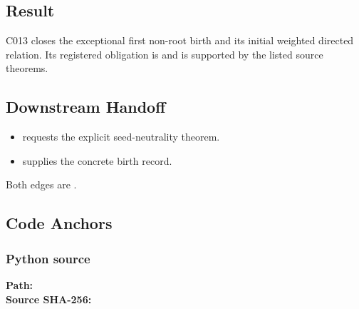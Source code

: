 \subsection{Result}\label{result-10}

C013 closes the exceptional first non-root birth and its initial
weighted directed relation. Its registered obligation is
\texttt{\protect{}} and is supported by the listed source
theorems.

\subsection{Downstream Handoff}\label{downstream-handoff-10}

\begin{itemize}
\tightlist
\item
  \texttt{\protect{}} requests the explicit
  seed-neutrality theorem.
\item
  \texttt{\protect{}} supplies the concrete
  birth record.
\end{itemize}

Both edges are \texttt{\protect{}}.

\subsection{Code Anchors}\label{code-anchors-8}

\subsubsection{Python source}\label{python-source-9}

\textbf{Path:}
\texttt{\protect{}}\\
\textbf{Source SHA-256:}
\texttt{\protect{}}

